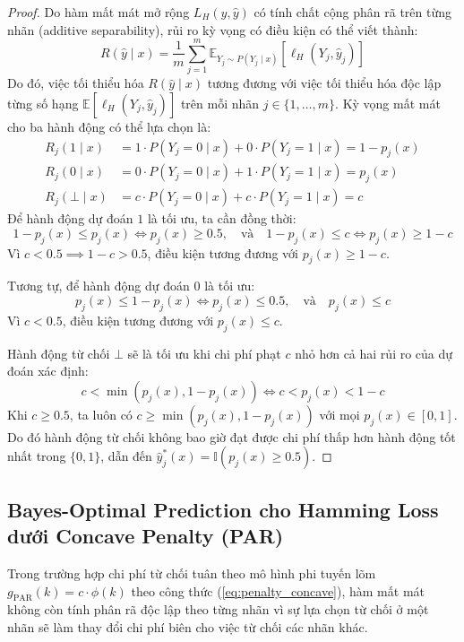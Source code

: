 \documentclass[11pt,a4paper]{article}
\begin{document}
\begin{proof}
Do hàm mất mát mở rộng $L_H(y, \hat{y})$ có tính chất cộng phân rã trên từng nhãn (additive separability), rủi ro kỳ vọng có điều kiện có thể viết thành:
\begin{equation}
R(\hat{y} \mid x) = \frac{1}{m} \sum_{j=1}^m \mathbb{E}_{Y_j \sim P(Y_j \mid x)}[\ell_H(Y_j, \hat{y}_j)]
\end{equation}
Do đó, việc tối thiểu hóa $R(\hat{y} \mid x)$ tương đương với việc tối thiểu hóa độc lập từng số hạng $\mathbb{E}[\ell_H(Y_j, \hat{y}_j)]$ trên mỗi nhãn $j \in \{1, \dots, m\}$. Kỳ vọng mất mát cho ba hành động có thể lựa chọn là:
\begin{align}
R_j(1 \mid x) &= 1 \cdot P(Y_j = 0 \mid x) + 0 \cdot P(Y_j = 1 \mid x) = 1 - p_j(x) \\
R_j(0 \mid x) &= 0 \cdot P(Y_j = 0 \mid x) + 1 \cdot P(Y_j = 1 \mid x) = p_j(x) \\
R_j(\bot \mid x) &= c \cdot P(Y_j = 0 \mid x) + c \cdot P(Y_j = 1 \mid x) = c
\end{align}
Để hành động dự đoán $1$ là tối ưu, ta cần đồng thời:
\begin{equation}
1 - p_j(x) \le p_j(x) \iff p_j(x) \ge 0.5, \quad \text{và} \quad 1 - p_j(x) \le c \iff p_j(x) \ge 1 - c
\end{equation}
Vì $c < 0.5 \implies 1 - c > 0.5$, điều kiện tương đương với $p_j(x) \ge 1 - c$.

Tương tự, để hành động dự đoán $0$ là tối ưu:
\begin{equation}
p_j(x) \le 1 - p_j(x) \iff p_j(x) \le 0.5, \quad \text{và} \quad p_j(x) \le c
\end{equation}
Vì $c < 0.5$, điều kiện tương đương với $p_j(x) \le c$.

Hành động từ chối $\bot$ sẽ là tối ưu khi chi phí phạt $c$ nhỏ hơn cả hai rủi ro của dự đoán xác định:
\begin{equation}
c < \min(p_j(x), 1 - p_j(x)) \iff c < p_j(x) < 1 - c
\end{equation}
Khi $c \ge 0.5$, ta luôn có $c \ge \min(p_j(x), 1 - p_j(x))$ với mọi $p_j(x) \in [0, 1]$. Do đó hành động từ chối không bao giờ đạt được chi phí thấp hơn hành động tốt nhất trong $\{0, 1\}$, dẫn đến $\hat{y}_j^*(x) = \mathbb{I}(p_j(x) \ge 0.5)$.
\end{proof}

\subsection{Bayes-Optimal Prediction cho Hamming Loss dưới Concave Penalty (PAR)}
Trong trường hợp chi phí từ chối tuân theo mô hình phi tuyến lõm $g_{\mathrm{PAR}}(k) = c \cdot \phi(k)$ theo công thức (\ref{eq:penalty_concave}), hàm mất mát không còn tính phân rã độc lập theo từng nhãn vì sự lựa chọn từ chối ở một nhãn sẽ làm thay đổi chi phí biên cho việc từ chối các nhãn khác.
\end{document}
